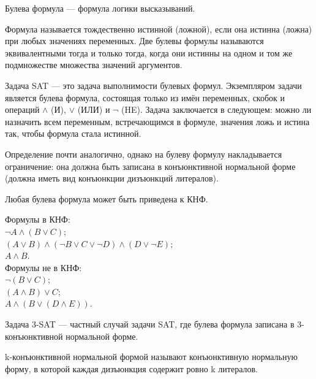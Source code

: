     \begin{Def}
        Булева формула --- формула логики высказываний.
    \end{Def}
    \begin{Rem}
        Формула называется тождественно истинной (ложной), если она истинна (ложна) при любых значениях переменных. Две булевы формулы называются эквивалентными тогда и только тогда, когда они истинны на одном и том же подмножестве множества значений аргументов.
    \end{Rem}
    \begin{Def}
        Задача \textsc{SAT} --- это задача выполнимости булевых формул. Экземпляром задачи является булева формула, состоящая только из имён переменных, скобок и операций  $\wedge$ (И), $\vee$ (ИЛИ) и $\neg$ (HE). Задача заключается в следующем: можно ли назначить всем переменным, встречающимся в формуле, значения ложь и истина так, чтобы формула стала истинной.
    \end{Def}
    \begin{Def}
        Определение почти аналогично, однако на булеву формулу накладывается ограничение: она должна быть записана в конъюнктивной нормальной форме (должна иметь вид конъюнкции дизъюнкций литералов).
    \end{Def}
    \begin{Rem}
        Любая булева формула может быть приведена к КНФ.
    \end{Rem}
    \begin{Example}
        Формулы в КНФ:\\
        $\neg A\wedge (B\vee C)$;\\
        $(A\vee B)\wedge (\neg B\vee C\vee \neg D)\wedge (D\vee \neg E)$;\\
        $A\wedge B$.\\
        Формулы не в КНФ:\\
        $\neg (B\vee C)$;\\
        $(A\wedge B)\vee C$;\\
        $A\wedge (B\vee (D\wedge E))$.
    \end{Example}
    \begin{Def}
        Задача \textsc{3-SAT} --- частный случай задачи \textsc{SAT}, где булева формула записана в 3-конъюнктивной нормальной форме.
    \end{Def}
    \begin{Def}[k-КНФ]
        k-конъюнктивной нормальной формой называют конъюнктивную нормальную форму, в которой каждая дизъюнкция содержит ровно k литералов.
    \end{Def}
